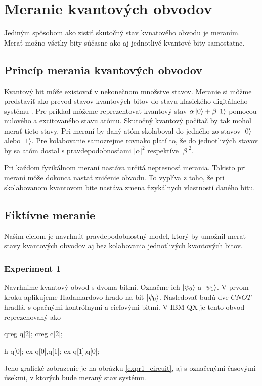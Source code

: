 
\chapter{Meranie kvantových obvodov}

Jediným spôsobom ako zistiť skutočný stav kvnatového obvodu je meraním.
Merať možno všetky bity súčasne ako aj jednotlivé kvantové bity samostatne.

\section{Princíp merania kvantových obvodov}

Kvantový bit môže existovať v nekonečnom množstve stavov. Meranie si môžme 
predstaviť ako prevod stavov kvantových bitov do stavu klasického digitálneho
systému \cite{Nie10}. Pre príklad môžeme reprezentovať kvantový stav 
\(\alpha\ket{0} + \beta\ket{1}\) pomocou nulového a excitovaného stavu atómu.
Skutočný kvantový počítač by tak mohol merať tieto stavy. Pri meraní by 
daný atóm skolaboval do jedného zo stavov \(\ket{0}\) alebo \(\ket{1}\).
Pre kolabovanie samozrejme rovnako platí to, že do jednotlivých stavov by
sa atóm dostal s pravdepodobnosťami \(|\alpha|^2\) respektíve \(|\beta|^2\).


Pri každom fyzikálnom meraní nastáva určitá nepresnosť merania. Takisto 
pri meraní môže dokonca nastať zničenie obvodu. To vyplíva z toho, že pri
skolabovanom kvantovom bite nastáva zmena fizykálnych vlastností daného bitu. 

\section{Fiktívne meranie}

Našim cieľom je navrhnúť pravdepodobnostný model, ktorý by umožnil merať
stavy kvantových obvodov aj bez kolabovania jednotlivých kvantových bitov.

\subsection{Experiment 1}
Navrhnime kvantový obvod s dvoma bitmi. Označme ich \(\ket{\psi_0}\) a 
\(\ket{\psi_1}\). V prvom kroku aplikujeme Hadamardovo hrado na bit 
\(\ket{\psi_0}\). Nasledovať budú dve \(CNOT\) hradlá, s opačnými kontrólnymi 
a cieľovými bitmi. V IBM QX je tento obvod reprezenovaný ako 
\begin{code}
qreg q[2];
creg c[2];

h q[0];
cx q[0],q[1];
cx q[1],q[0];
\end{code}
Jeho grafické zobrazenie je na obrázku \ref{expr1_circuit}, aj s označenými
časovými úsekmi, v ktorých bude meraný stav systému. 

